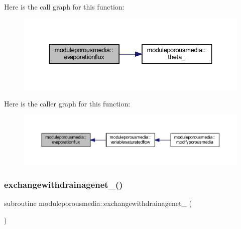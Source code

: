 Here is the call graph for this function\+:\nopagebreak
\begin{figure}[H]
\begin{center}
\leavevmode
\includegraphics[width=336pt]{namespacemoduleporousmedia_a9e2789b14ba4547dcad30834e1068477_cgraph}
\end{center}
\end{figure}
Here is the caller graph for this function\+:\nopagebreak
\begin{figure}[H]
\begin{center}
\leavevmode
\includegraphics[width=350pt]{namespacemoduleporousmedia_a9e2789b14ba4547dcad30834e1068477_icgraph}
\end{center}
\end{figure}
\mbox{\label{namespacemoduleporousmedia_a448128120b85135d0a29b8fbdb5a0b1e}} 
\subsubsection{\texorpdfstring{exchangewithdrainagenet\+\_()}{exchangewithdrainagenet\_1()}}
{\footnotesize\ttfamily subroutine moduleporousmedia\+::exchangewithdrainagenet\+\_ (\begin{DoxyParamCaption}{ }\end{DoxyParamCaption})\hspace{0.3cm}{\ttfamily [private]}}

